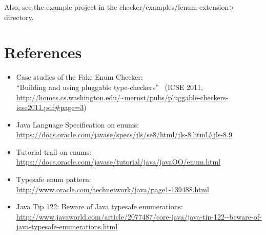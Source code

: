 Also, see the example project in the \<checker/examples/fenum-extension> directory.



\section{References\label{fenum-references}}

\begin{itemize}
\item Case studies of the Fake Enum Checker:\\
  ``Building and using pluggable type-checkers''~\cite{DietlDEMS2011}
  (ICSE 2011, \url{http://homes.cs.washington.edu/~mernst/pubs/pluggable-checkers-icse2011.pdf#page=3})

\item Java Language Specification on enums:\\
  \url{https://docs.oracle.com/javase/specs/jls/se8/html/jls-8.html#jls-8.9}

\item Tutorial trail on enums:\\
  \url{https://docs.oracle.com/javase/tutorial/java/javaOO/enum.html}

\item Typesafe enum pattern:\\
  \url{http://www.oracle.com/technetwork/java/page1-139488.html}

\item Java Tip 122: Beware of Java typesafe enumerations:\\
  \url{http://www.javaworld.com/article/2077487/core-java/java-tip-122--beware-of-java-typesafe-enumerations.html}

\end{itemize}

